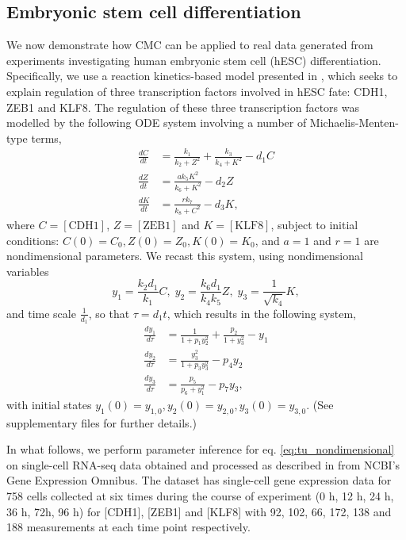 \subsection{Embryonic stem cell differentiation}\label{sec:hesc}
We now demonstrate how CMC can be applied to real data generated from experiments investigating human embryonic stem cell (hESC) differentiation. Specifically, we use a reaction kinetics-based model presented in \cite{tu2019single}, which seeks to explain regulation of three transcription factors involved in hESC fate: CDH1, ZEB1 and KLF8. The regulation of these three transcription factors was modelled by the following ODE system involving a number of Michaelis-Menten-type terms,
%
\begin{equation}
\begin{aligned}
\frac{d C}{d t} &= \frac{k_1}{k_2 + Z^2} + \frac{k_3}{k_4 + K^2} - d_1 C\\
\frac{d Z}{d t} &= \frac{a k_5 K^2}{k_6 + K^2} - d_2 Z\\
\frac{d K}{d t} &= \frac{r k_7}{k_8 + C^2} - d_3 K,
\end{aligned}
\end{equation}
%
where $C=[\text{CDH1}]$, $Z=[\text{ZEB1}]$ and $K=[\text{KLF8}]$, subject to initial conditions: $C(0) = C_0, Z(0)=Z_0, K(0) = K_0$, and $a=1$ and $r=1$ are nondimensional parameters. We recast this system, using nondimensional variables
%
\begin{equation}
y_1 = \frac{k_2 d_1}{k_1} C, \; y_2 = \frac{k_6 d_1}{k_4 k_5} Z, \; y_3 = \frac{1}{\sqrt{k_4}} K,
\end{equation}
%
and time scale $\frac{1}{d_1}$, so that $\tau = d_1 t$, which results in the following system,
%
\begin{equation}\label{eq:tu_nondimensional}
\begin{aligned}
\frac{d y_1}{ d\tau} &= \frac{1}{1 + p_1 y_2^2} + \frac{p_2}{1 + y_3^2} - y_1\\
\frac{d y_2}{ d\tau} &= \frac{y_3^2}{1 + p_3 y_3^2} - p_4 y_2\\
\frac{d y_3}{d\tau} &= \frac{p_5}{p_6 + y_1^2} - p_7 y_3,
\end{aligned}
\end{equation}
%
with initial states $y_1(0) = y_{1,0}, y_2(0) = y_{2,0}, y_3(0) = y_{3,0}$. (See supplementary files for further details.)

In what follows, we perform parameter inference for eq. \eqref{eq:tu_nondimensional} on single-cell RNA-seq data obtained and processed as described in \cite{tu2019single} from NCBI's Gene Expression Omnibus. The dataset has single-cell gene expression data for 758 cells collected at six times during the course of experiment (0 h, 12 h, 24 h, 36 h, 72h, 96 h) for [CDH1], [ZEB1] and [KLF8] with 92, 102, 66, 172, 138 and 188 measurements at each time point respectively.


